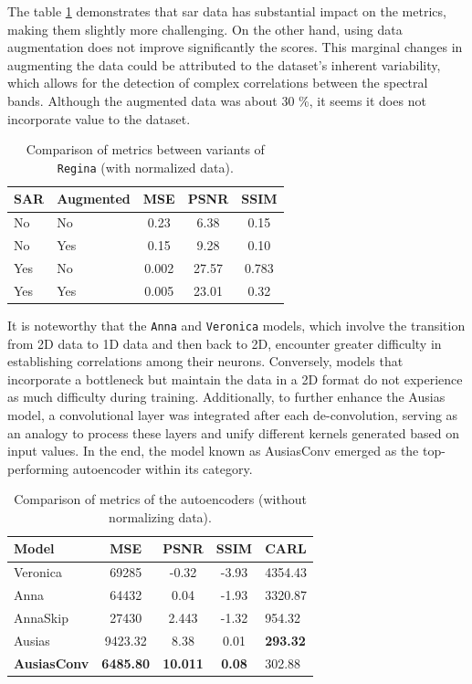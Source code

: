 The table \ref{tab:models-metrics-regina} demonstrates that \gls{sar} data has substantial impact on the metrics, making them slightly more challenging. On the other hand, using data augmentation does not improve significantly the scores. This marginal changes in augmenting the data could be attributed to the dataset's inherent variability, which allows for the detection of complex correlations between the spectral bands. Although the augmented data was about 30 \%, it seems it does not incorporate value to the dataset.
\begin{table}[H]
	\caption{Comparison of metrics between variants of \texttt{Regina} (with normalized data).}
	\centering
	\begin{tabular}{ll|ccc}
		SAR & Augmented &  MSE  & PSNR  & SSIM  \\ \hline
		No  & No        & 0.23  & 6.38  & 0.15  \\
		No  & Yes       & 0.15  & 9.28  & 0.10  \\
		Yes & No        & 0.002 & 27.57 & 0.783 \\
		Yes & Yes       & 0.005 & 23.01 & 0.32
	\end{tabular}
	\label{tab:models-metrics-regina}
\end{table}
It is noteworthy that the \texttt{Anna} and \texttt{Veronica} models, which involve the transition from 2D data to 1D data and then back to 2D, encounter greater difficulty in establishing correlations among their neurons. Conversely, models that incorporate a bottleneck but maintain the data in a 2D format do not experience as much difficulty during training. Additionally, to further enhance the Ausias model, a convolutional layer was integrated after each de-convolution, serving as an analogy to process these layers and unify different kernels generated based on input values.
 In the end, the model known as AusiasConv emerged as the top-performing autoencoder within its category.
\begin{table}[H]
	\caption{Comparison of metrics of the autoencoders (without normalizing data).}
	\centering
	\begin{tabular}{l|cccl}
		Model               &       MSE        &      PSNR       &     SSIM      & CARL            \\ \hline
		Veronica            &      69285       &      -0.32      &     -3.93     & 4354.43         \\
		Anna                &      64432       &      0.04       &     -1.93     & 3320.87         \\
		AnnaSkip            &      27430       &      2.443      &     -1.32     & 954.32          \\
		Ausias              &     9423.32      &      8.38       &     0.01      & \textbf{293.32} \\
		\textbf{AusiasConv} & \textbf{6485.80} & \textbf{10.011} & \textbf{0.08} & 302.88
	\end{tabular}
	\label{tab:models-metrics-ae}
\end{table}

